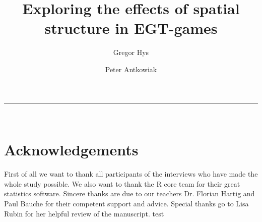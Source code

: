 \documentclass{article}
\title{Exploring the effects of spatial structure in EGT-games}
\author{Gregor Hys \and Peter Antkowiak}
\newcommand{\HRule}{\rule{\linewidth}{0.5mm}}
\begin{document}
\maketitle


\vfill



\HRule \\[0.5cm]




\newpage

\twocolumn
\sloppy












\section*{Acknowledgements}
First of all we want to thank all participants of the interviews who have made the whole study possible. We also want to thank the R core team for their great statistics software. Sincere thanks are due to our teachers Dr. Florian Hartig and Paul Bauche for their competent support and advice. Special thanks go to Lisa Rubin for her helpful review of the manuscript.
\citep{HauertandDoebeli2004} test


\onecolumn

\newpage
\newpage




\end{document}

